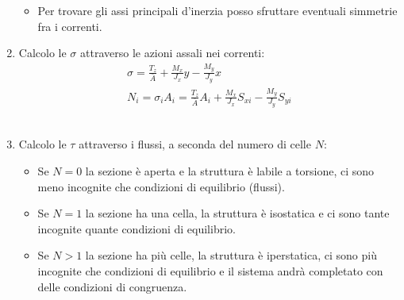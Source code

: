 \begin{enumerate}
\begin{itemize}
    \item Per trovare gli assi principali d'inerzia posso sfruttare eventuali simmetrie fra i correnti.
    \end{itemize}
    \item Calcolo le $\sigma$ attraverso le azioni assali nei correnti:
    \begin{align*}
        \sigma = \frac{T_z}{\bar{A}} +  \frac{M_x}{J_x}y -\frac{M_y}{J_y}x \\
        N_i = \sigma_iA_i= \frac{T_z}{\bar{A}}A_i +  \frac{M_x}{J_x}S_{xi} -\frac{M_y}{J_y}S_{yi}
     \end{align*}\\
    \item Calcolo le $\tau$ attraverso i flussi, a seconda del numero di celle $N$:
    \begin{itemize}
        \item Se $N=0$ la sezione è aperta e la struttura è labile a torsione, ci sono meno incognite che condizioni di equilibrio (flussi).\\
        \item Se $N=1$ la sezione ha una cella, la struttura è isostatica e ci sono tante incognite quante condizioni di equilibrio.\\
        \item Se $N>1$ la sezione ha più celle, la struttura è iperstatica, ci sono più incognite che condizioni di equilibrio e il sistema andrà completato con delle condizioni di congruenza.
    \end{itemize}
\end{enumerate}

